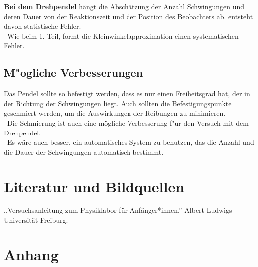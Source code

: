 \documentclass[11pt,a4paper]{article} %
\begin{document}
\textbf{Bei dem Drehpendel} hängt die Abschätzung der Anzahl Schwingungen und deren Dauer von der Reaktionszeit und der Position des Beobachters ab. entsteht davon statistische Fehler.
\\\
Wie beim 1. Teil, formt die Kleinwinkelapproximation einen systematischen Fehler.
\subsection{ M"ogliche Verbesserungen}
Das Pendel sollte so befestigt werden, dass es nur einen Freiheitsgrad hat, der in der Richtung der Schwingungen liegt. Auch sollten die Befestigungspunkte geschmiert werden, um die Auswirkungen der Reibungen zu minimieren.
\\\
Die Schmierung ist auch eine mögliche Verbesserung f"ur den Versuch mit dem Drehpendel.
\\\
Es wäre auch besser, ein automatisches System zu benutzen, das die Anzahl und die Dauer der Schwingungen automatisch bestimmt.
\section{Literatur und Bildquellen}
,,Versuchsanleitung zum Physiklabor für Anfänger*innen.'' Albert-Ludwigs-Universität Freiburg. 


\section{Anhang}
\end{document}
